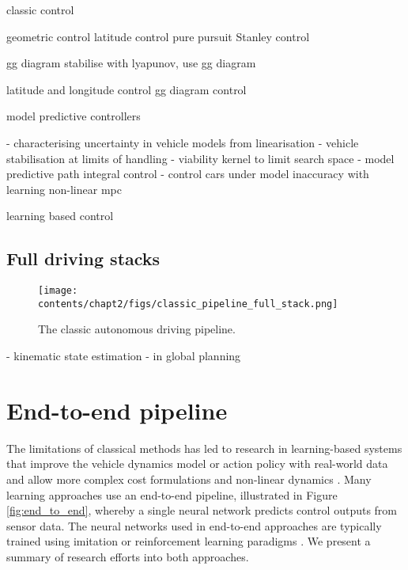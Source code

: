 classic control

geometric control
latitude control
\cite{Coulter_1992} pure pursuit
\cite{Hoffmann2007} Stanley control

gg diagram
\cite{talvala2011} stabilise with lyapunov, use gg diagram

latitude and longitude control
\cite{Kritayakirana2010} gg diagram control


model predictive controllers

\cite{Pup2020} - characterising uncertainty in vehicle models from linearisation
\cite{Beal2013} - vehicle stabilisation at limits of handling
\cite{Liniger2019} - viability kernel to limit search space
\cite{Williams2016} - model predictive path integral control  
\cite{Hewing2018} - control cars under model inaccuracy with learning non-linear mpc

learning based control
\cite{Ji2018}
\cite{Brunner2018a}

\subsection{Full driving stacks}
\label{sec:full_driving_stacks}

\begin{figure}[h]
    \centering
    \texttt{[image: contents/chapt2/figs/classic\_pipeline\_full\_stack.png]}
    \caption{The classic autonomous driving pipeline.}
    \label{fig:full_stack}
\end{figure}

\cite{Valls2018}
\cite{sherif2020}
\cite{Wischnewski2019} - kinematic state estimation
\cite{Vazquez2020} - in global planning
\cite{alvarez2022}

\section{End-to-end pipeline}
\label{sec:end_to_end}

The limitations of classical methods has led to research in learning-based systems that improve the vehicle dynamics model or action policy with real-world data and allow more complex cost formulations and non-linear dynamics \cite{Fuchs2021}.
Many learning approaches use an end-to-end pipeline, illustrated in Figure \ref{fig:end_to_end}, whereby a single neural network predicts control outputs from sensor data.
The neural networks used in end-to-end approaches are typically trained using imitation or reinforcement learning paradigms \cite{Betz2021}. We present a summary of research efforts into both approaches.

